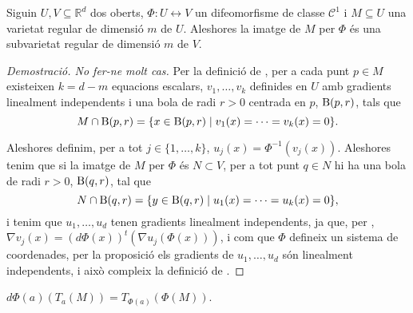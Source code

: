 \documentclass[../Apunts.tex]{subfiles}
\begin{document}
	\begin{proposition}
		Siguin \(U,V\subseteq\mathbb{R}^{d}\) dos oberts, \(\Phi\colon U\longleftrightarrow V\) un difeomorfisme de classe \(\mathcal{C}^{1}\) i \(M\subseteq U\) una varietat regular de dimensió \(m\) de \(U\). Aleshores la imatge de \(M\) per \(\Phi\) és una subvarietat regular de dimensió \(m\) de \(V\). %
		\begin{proof}[Demostració. No fer-ne molt cas]
			Per la definició de , per a cada punt \(p\in M\) existeixen \(k=d-m\) equacions escalars, \(v_{1},\dots,v_{k}\) definides en \(U\) amb gradients linealment independents i una bola de radi \(r>0\) centrada en \(p\), \(\operatorname{B}(p,r)\), tals que
			\[M\cap\operatorname{B}(p,r)=\{x\in\operatorname{B}(p,r)\mid v_{1}(x)=\dots=v_{k}(x)=0\}.\]
			
			Aleshores definim, per a tot \(j\in\{1,\dots,k\}\), \(u_{j}(x)=\Phi^{-1}(v_{j}(x))\). Aleshores tenim que si la imatge de \(M\) per \(\Phi\) és \(N\subset V\), per a tot punt \(q\in N\) hi ha una bola de radi \(r>0\), \(\operatorname{B}(q,r)\), tal que
			\[N\cap\operatorname{B}(q,r)=\{y\in\operatorname{B}(q,r)\mid u_{1}(x)=\dots=u_{k}(x)=0\},\]
			i tenim que \(u_{1},\dots,u_{d}\) tenen gradients linealment independents, ja que, per , \(\nabla v_{j}(x)=(d\Phi(x))^{t}(\nabla u_{j}(\Phi(x)))\), i com que \(\Phi\) defineix un sistema de coordenades, per la proposició  els gradients de \(u_{1},\dots,u_{d}\) són linealment independents, i això compleix la definició de . %
		\end{proof}
	\end{proposition}
	\begin{corollary}
		\(d\Phi(a)(T_{a}(M))=T_{\Phi(a)}(\Phi(M))\).
	\end{corollary}
\end{document}
